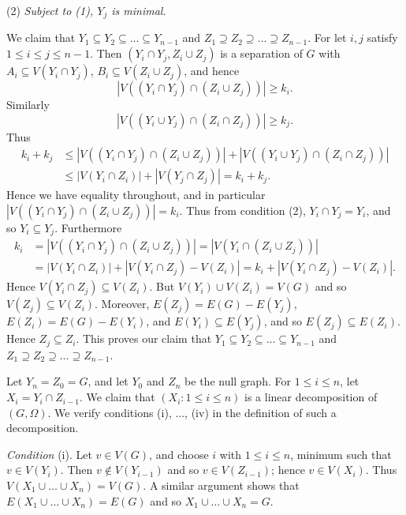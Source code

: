 \hspace*{12pt}(2) \textit{Subject to (1), $Y_j$ is minimal.}

We claim that $Y_1 \subseteq Y_2 \subseteq \dots \subseteq Y_{n-1}$ and $Z_1 \supseteq Z_2 \supseteq \dots \supseteq Z_{n-1}$. For let $i, j$ satisfy $1 \le i \le j \le n-1$. Then $(Y_i \cap Y_j, Z_i \cup Z_j)$ is a separation of $G$ with $A_i \subseteq V(Y_i \cap Y_j)$, $B_i \subseteq V(Z_i \cup Z_j)$, and hence
\begin{equation*}
|V((Y_i \cap Y_j) \cap (Z_i \cup Z_j))| \ge k_i.
\end{equation*}
Similarly
\begin{equation*}
|V((Y_i \cup Y_j) \cap (Z_i \cap Z_j))| \ge k_j.
\end{equation*}
Thus
\begin{align*}
k_i + k_j &\le |V((Y_i \cap Y_j) \cap (Z_i \cup Z_j))| + |V((Y_i \cup Y_j) \cap (Z_i \cap Z_j))| \\
&\le |V(Y_i \cap Z_i)| + |V(Y_j \cap Z_j)| = k_i + k_j.
\end{align*}
Hence we have equality throughout, and in particular $|V((Y_i \cap Y_j) \cap (Z_i \cup Z_j))| = k_i$. Thus from condition (2), $Y_i \cap Y_j = Y_i$, and so $Y_i \subseteq Y_j$. Furthermore
\begin{align*}
k_i &= |V((Y_i \cap Y_j) \cap (Z_i \cup Z_j))| = |V(Y_i \cap (Z_i \cup Z_j))| \\
&= |V(Y_i \cap Z_i)| + |V(Y_i \cap Z_j) - V(Z_i)| = k_i + |V(Y_i \cap Z_j) - V(Z_i)|.
\end{align*}
Hence $V(Y_i \cap Z_j) \subseteq V(Z_i)$. But $V(Y_i) \cup V(Z_i) = V(G)$ and so $V(Z_j) \subseteq V(Z_i)$. Moreover, $E(Z_j) = E(G) - E(Y_j)$, $E(Z_i) = E(G) - E(Y_i)$, and $E(Y_i) \subseteq E(Y_j)$, and so $E(Z_j) \subseteq E(Z_i)$. Hence $Z_j \subseteq Z_i$. This proves our claim that $Y_1 \subseteq Y_2 \subseteq \dots \subseteq Y_{n-1}$ and $Z_1 \supseteq Z_2 \supseteq \dots \supseteq Z_{n-1}$.

Let $Y_n = Z_0 = G$, and let $Y_0$ and $Z_n$ be the null graph. For $1 \le i \le n$, let $X_i = Y_i \cap Z_{i-1}$. We claim that $(X_i: 1 \le i \le n)$ is a linear decomposition of $(G, \Omega)$. We verify conditions (i), ..., (iv) in the definition of such a decomposition.

\textit{Condition} (i). Let $v \in V(G)$, and choose $i$ with $1 \le i \le n$, minimum such that $v \in V(Y_i)$. Then $v \notin V(Y_{i-1})$ and so $v \in V(Z_{i-1})$; hence $v \in V(X_i)$. Thus $V(X_1 \cup \dots \cup X_n) = V(G)$. A similar argument shows that $E(X_1 \cup \dots \cup X_n) = E(G)$ and so $X_1 \cup \dots \cup X_n = G$.

